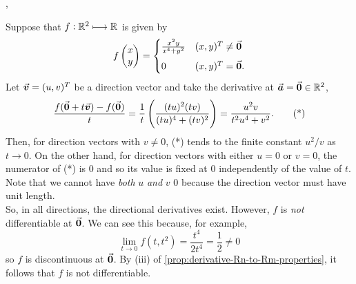 \documentclass[../MathsNotesBase.tex]{subfiles}
\begin{document}
{		
		\nl[6]
		\sep
		\begin{exe}
			\ex Suppose that ${ f: \mathbb{R}^{2} \longmapsto \mathbb{R}^{} }$ is given by
			\[ f\begin{pmatrix}x\\ y\end{pmatrix} = \begin{cases}
														\frac{ x^2 y }{ x^4 + y^2 } & (x,y)^T \neq \0 \nn
														0         & (x,y)^T = \0.
													\end{cases} 
			\]
			Let ${ \vec{\bm{v}} = (u,v)^T }$ be a direction vector and take the derivative at ${ \vec{\bm{a}} = \vec{\bm{0}} \in \mathbb{R}^{2} }$,
			\[ \frac{ f(\vec{\bm{0}} + t\vec{\bm{v}}) - f(\vec{\bm{0}}) }{ t } = \frac{1}{t} \left(  \frac{ (tu)^2 (tv) }{ (tu)^4 + (tv)^2 } \right) = \frac{ u^2 v }{ t^2 u^4 + v^2 }. \tag{*} \]
			Then, for direction vectors with ${ v \neq 0 }$, (*) tends to the finite constant ${ u^2 / v }$ as ${ t \to 0 }$. On the other hand, for direction vectors with either ${ u = 0 }$ or ${ v = 0 }$, the numerator of (*) is 0 and so its value is fixed at 0 independently of the value of $t$. Note that we cannot have \textit{both} $u$ \textit{and} $v$ 0 because the direction vector must have unit length.\\
			
			So, in all directions, the directional derivatives exist. However, $f$ is \textit{not} differentiable at $\vec{\bm{0}}$. We can see this because, for example,
			\[ \lim_{t \to 0} f(t, t^2) = \frac{ t^4 }{ 2 t^4 } = \frac{1}{2} \neq 0 \]
			so $f$ is discontinuous at $\vec{\bm{0}}$. By (iii) of \autoref{prop:derivative-Rn-to-Rm-properties}, it follows that $f$ is not differentiable.
		\end{exe}
	}


\pagebreak
\end{document}
